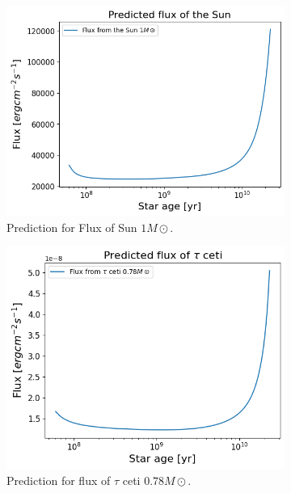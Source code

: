 \begin{figure}[H]
	\centering
	\begin{subfigure}{\textwidth}
		\includegraphics[width=\textwidth,height=0.5\textheight]{assets/fluxsun.png}
		\caption{Prediction for Flux of Sun $1 M\odot$.}
	\end{subfigure}
	\begin{subfigure}{\textwidth}
		\includegraphics[width=\textwidth,height=0.5\textheight]{assets/fluxtau.png}
		\caption{Prediction for flux of $\tau$ ceti $0.78 M\odot$.}
	\end{subfigure}
	\begin{subfigure}{\textwidth}

\end{subfigure}
\end{figure}
